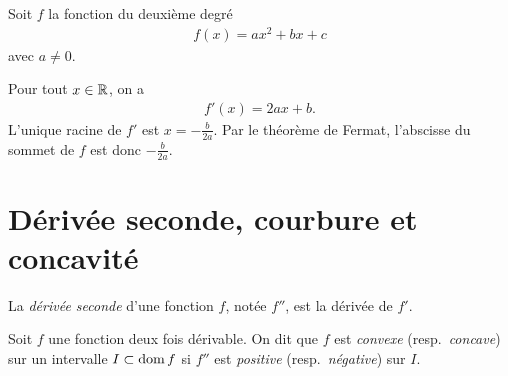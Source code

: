 \documentclass[main.tex]{subfiles}
\begin{document}
\begin{example}

    Soit $f$ la fonction du deuxième degré
    \begin{align}
        f(x) = a x^2 + bx + c
    \end{align}
    avec $a \neq 0$.

    Pour tout $x \in \mathbb{R}$, on a
    \begin{align}
        f'(x) = 2ax + b.
    \end{align}
    L'unique racine de $f'$ est $x = - \frac{b}{2a}$.
    Par le théorème de Fermat, l'abscisse du sommet de $f$ est donc $- \frac{b}{2a}$.
\end{example}

\section{Dérivée seconde, courbure et concavité}

La \emph{dérivée seconde} d'une fonction $f$,
notée $f''$,
est la dérivée de $f'$.

\begin{definition}
    [Convexité]

    Soit $f$ une fonction deux fois dérivable.
    On dit que $f$ est \emph{convexe} (resp.\ \emph{concave}) sur un intervalle $I \subset \operatorname{dom} f$
    si $f''$ est \emph{positive} (resp.\ \emph{négative}) sur $I$.
\end{definition}
\end{document}
